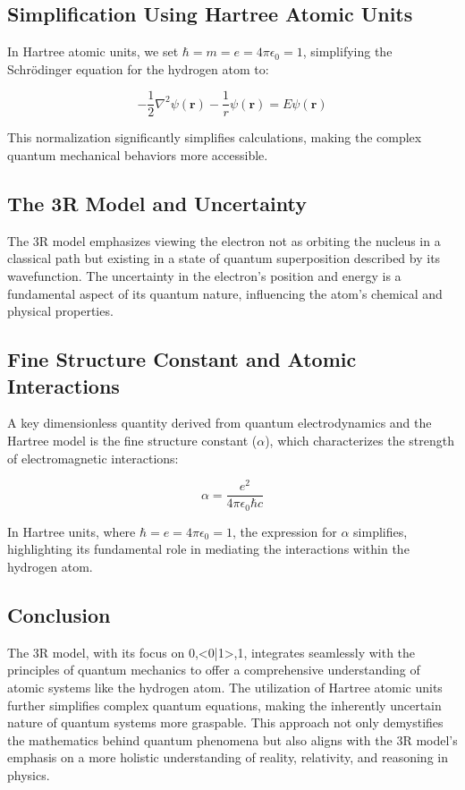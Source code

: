 \documentclass[12pt]{article}
\begin{document}
\subsection*{Simplification Using Hartree Atomic Units}

In Hartree atomic units, we set $\hbar = m = e = 4\pi\epsilon_0 = 1$, simplifying the Schrödinger equation for the hydrogen atom to:

\begin{equation}
    -\frac{1}{2}\nabla^2\psi(\mathbf{r}) - \frac{1}{r}\psi(\mathbf{r}) = E\psi(\mathbf{r})
\end{equation}

This normalization significantly simplifies calculations, making the complex quantum mechanical behaviors more accessible.

\subsection*{The 3R Model and Uncertainty}

The 3R model emphasizes viewing the electron not as orbiting the nucleus in a classical path but existing in a state of quantum superposition described by its wavefunction. The uncertainty in the electron's position and energy is a fundamental aspect of its quantum nature, influencing the atom's chemical and physical properties.

\subsection*{Fine Structure Constant and Atomic Interactions}

A key dimensionless quantity derived from quantum electrodynamics and the Hartree model is the fine structure constant ($\alpha$), which characterizes the strength of electromagnetic interactions:

\begin{equation}
    \alpha = \frac{e^2}{4\pi \epsilon_0 \hbar c}
\end{equation}

In Hartree units, where $\hbar = e = 4\pi\epsilon_0 = 1$, the expression for $\alpha$ simplifies, highlighting its fundamental role in mediating the interactions within the hydrogen atom.

\subsection*{Conclusion}

The 3R model, with its focus on {0,<0|1>,1}, integrates seamlessly with the principles of quantum mechanics to offer a comprehensive understanding of atomic systems like the hydrogen atom. The utilization of Hartree atomic units further simplifies complex quantum equations, making the inherently uncertain nature of quantum systems more graspable. This approach not only demystifies the mathematics behind quantum phenomena but also aligns with the 3R model's emphasis on a more holistic understanding of reality, relativity, and reasoning in physics.
\end{document}
